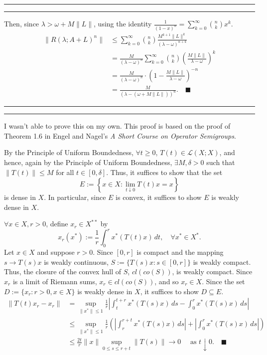 \documentclass[11pt]{article}
\newcounter{questionCounter}
\newcounter{partCounter}[questionCounter]
\newenvironment{question}[2][\arabic{questionCounter}]{%
    \setcounter{partCounter}{0}%
    \vspace{.25in} \hrule \vspace{0.5em}%
        \noindent{\bf #2}%
    \vspace{0.8em} \hrule \vspace{.10in}%
    \addtocounter{questionCounter}{1}%
}{}
\renewcommand{\qed}{\quad \ensuremath{\blacksquare}}
\renewcommand{\L}{\mathcal{L}}          %
\begin{document}
\begin{question}{Problem 6}
Then, since $\lambda > \omega + M\|L\|$, using the identity
$\frac{1}{(1 - x)^n} = \sum_{k = 0}^\infty \binom{n}{k} x^k$.
\begin{align*}
\|R(\lambda; A + L)^n\|
 &  \leq \sum_{k = 0}^\infty \binom{n}{k} \frac{M^{k + 1}\|L\|^k}
                                            {(\lambda - \omega)^{n + k}}    \\
 &  = \frac{M}{(\lambda - \omega)^n}
        \sum_{k = 0}^\infty \binom{n}{k} \left( \frac{M\|L\|}
                                {\lambda - \omega} \right)^k    \\
 &  = \frac{M}{(\lambda - \omega)^n} \cdot \left(1 - \frac{M\|L\|}
                                                {\lambda - \omega}\right)^{-n}         \\
 &  = \frac{M}{(\lambda - (\omega + M\|L\|))^n}. \qed
\end{align*}
\end{question}

\newpage
\begin{question}{Problem 7}
I wasn't able to prove this on my own. This proof is based on the proof of
Theorem 1.6 in Engel and Nagel's
\emph{A Short Course on Operator Semigroups}.

By the Principle of Uniform Boundedness, $\forall t \geq 0$,
$T(t) \in \L(X;X)$, and hence, again by the Principle of Uniform Boundedness,
$\exists M, \delta > 0$ such that $\|T(t)\| \leq M$ for all $t \in [0,\delta]$.
Thus, it suffices to show that the set
\[E := \left\{ x \in X : \lim_{t \downarrow 0} T(t)x = x \right\}\]
is dense in $X$. In particular, since $E$ is convex, it suffices to show $E$ is
weakly dense in $X$.

$\forall x \in X, r > 0$, define $x_r \in X^{**}$ by
\[x_r(x^*)
    := \frac{1}{r} \int_0^r x^*(T(t)x) \, dt, \quad \forall x^* \in X^*.
\]
Let $x \in X$ and suppose $r > 0$. Since $[0,r]$ is compact and the mapping
$s \to T(s)x$ is weakly continuous, $S := \{T(s)x : s \in [0,r]\}$ is weakly
compact. Thus, the closure of the convex hull of $S$, $cl(co(S))$, is weakly
compact. Since $x_r$ is a limit of Riemann sums, $x_r \in cl(co(S))$, and so
$x_r \in X$. Since the set $D := \{x_r : r > 0, x \in X\}$ is weakly dense in
$X$, it suffices to show $D \subseteq E$.
\begin{align*}
\|T(t)x_r - x_r\|
    & = \sup_{\|x^*\| \leq 1} \frac{1}{r}
            \left| \int_t^{t + r} x^*(T(s)x) \, ds
                - \int_0^r x^*(T(s)x) \, ds\right|  \\
    & \leq \sup_{\|x^*\| \leq 1} \frac{1}{r}
            \left( \left| \int_r^{r + t} x^*(T(s)x) \, ds\right|
                + \left|\int_0^r x^*(T(s)x) \, ds \right| \right)  \\
    & \leq \frac{2t}{r} \|x\| \sup_{0 \leq s \leq r + t} \|T(s)\|
      \to 0 \quad \mbox{ as } t \downarrow 0. \qed
\end{align*}
\end{question}
\end{document}
